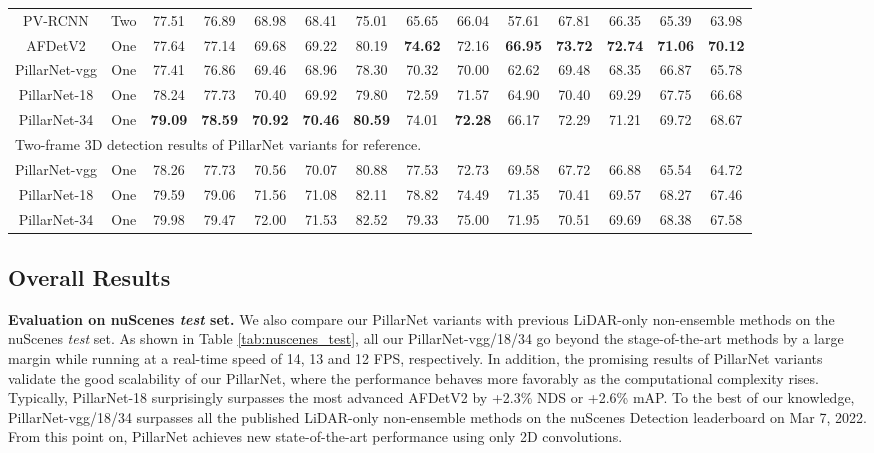\documentclass[runningheads]{llncs}
\begin{document}
\begin{table}[th]
{\begin{tabular}{c|c|cc|cc|cc|cc|cc|cc}
PV-RCNN \cite{shi2020pv}& Two & 77.51 & 76.89 & 68.98 & 68.41 & 75.01 & 65.65 & 66.04 & 57.61 & 67.81 & 66.35 & 65.39 & 63.98 \\
AFDetV2 \cite{Hu2021AFDetV2RT} & One & 77.64 & 77.14 & 69.68 & 69.22 & 80.19 & \textbf{74.62} & 72.16 & \textbf{66.95} & \textbf{73.72} & \textbf{72.74} & \textbf{71.06} & \textbf{70.12} \\ \hline
PillarNet-vgg & One & 77.41 & 76.86 &69.46 & 68.96 & 78.30 & 70.32 & 70.00 & 62.62 & 69.48 & 68.35 & 66.87 & 65.78 \\
PillarNet-18 & One & 78.24 & 77.73 & 70.40 & 69.92 & 79.80 & 72.59 & 71.57 & 64.90 & 70.40 & 69.29 & 67.75 & 66.68 \\
PillarNet-34 & One & \textbf{79.09} & \textbf{78.59} & \textbf{70.92} & \textbf{70.46} & \textbf{80.59} & 74.01 & \textbf{72.28} & 66.17 & 72.29 & 71.21 & 69.72 & 68.67 \\ \hline
\multicolumn{14}{l}{Two-frame 3D detection results of PillarNet variants for reference.} \\
PillarNet-vgg & One & 78.26 & 77.73 & 70.56 & 70.07 & 80.88 & 77.53 & 72.73 & 69.58 & 67.72 & 66.88 & 65.54 & 64.72\\
PillarNet-18 & One & 79.59 & 79.06 & 71.56 & 71.08 & 82.11 & 78.82 & 74.49 & 71.35 & 70.41 & 69.57 & 68.27 & 67.46\\
PillarNet-34 & One & 79.98 & 79.47 & 72.00 & 71.53 & 82.52 & 79.33 & 75.00 & 71.95 & 70.51 & 69.69 & 68.38 & 67.58 \\ \hline    
\end{tabular}
}
\end{table}


\subsection{Overall Results}


{\flushleft \bf Evaluation on nuScenes \textit{test} set.}
We also compare our PillarNet variants with previous LiDAR-only non-ensemble methods on the nuScenes \textit{test} set. 
As shown in Table \ref{tab:nuscenes_test}, 
all our PillarNet-vgg/18/34 go beyond the stage-of-the-art methods by a large margin while running at a real-time speed of 14, 13 and 12 FPS, respectively.
In addition, the promising results of PillarNet variants validate the good scalability of our PillarNet, where the performance behaves more favorably as the computational complexity rises.
Typically, PillarNet-18 surprisingly surpasses the most advanced AFDetV2 by +2.3\% NDS or +2.6\% mAP.
To the best of our knowledge, PillarNet-vgg/18/34 surpasses all the published LiDAR-only non-ensemble methods on the nuScenes Detection leaderboard on Mar 7, 2022.
From this point on, PillarNet achieves new state-of-the-art performance using only 2D convolutions.
\end{document}

